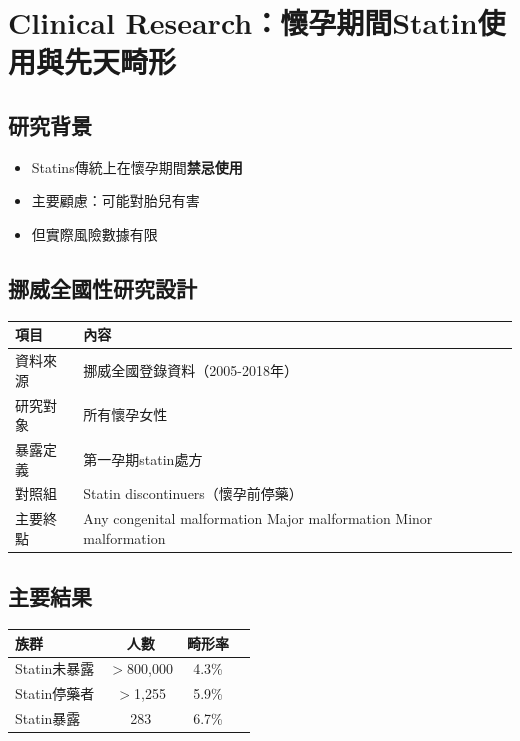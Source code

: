 \documentclass[12pt,a4paper]{article}
\begin{document}
\section{Clinical Research：懷孕期間Statin使用與先天畸形}

\subsection{研究背景}

\begin{itemize}
    \item Statins傳統上在懷孕期間\textbf{禁忌使用}
    \item 主要顧慮：可能對胎兒有害
    \item 但實際風險數據有限
\end{itemize}

\subsection{挪威全國性研究設計}

\begin{longtable}{p{4cm}p{10cm}}
\toprule
\textbf{項目} & \textbf{內容} \\
\midrule
\endfirsthead
\bottomrule
\endfoot

資料來源 & 挪威全國登錄資料（2005-2018年） \\
\midrule
研究對象 & 所有懷孕女性 \\
\midrule
暴露定義 & 第一孕期statin處方 \\
\midrule
對照組 & Statin discontinuers（懷孕前停藥） \\
\midrule
主要終點 & Any congenital malformation\newline
Major malformation\newline
Minor malformation \\
\bottomrule
\end{longtable}

\subsection{主要結果}

\begin{longtable}{lccc}
\toprule
\textbf{族群} & \textbf{人數} & \textbf{畸形率} \\
\midrule
\endfirsthead
\bottomrule
\endfoot

Statin未暴露 & $>$800,000 & 4.3\% \\
Statin停藥者 & $>$1,255 & 5.9\% \\
Statin暴露 & 283 & 6.7\% \\
\bottomrule
\end{longtable}
\end{document}
